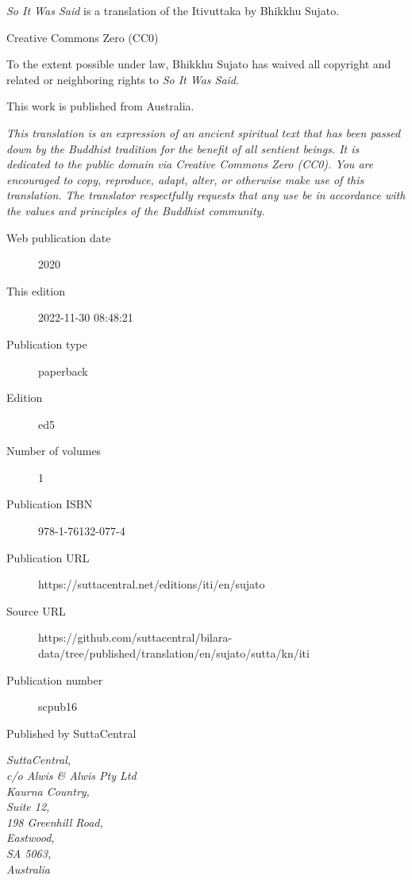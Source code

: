 \documentclass[12pt,openany]{book}%
\begin{document}
\begin{footnotesize}

\textit{So It Was Said} is a translation of the Itivuttaka by Bhikkhu Sujato.

\medskip

Creative Commons Zero (CC0)

To the extent possible under law, Bhikkhu Sujato has waived all copyright and related or neighboring rights to \textit{So It Was Said}.

\medskip

This work is published from Australia.

\begin{center}
\textit{This translation is an expression of an ancient spiritual text that has been passed down by the Buddhist tradition for the benefit of all sentient beings. It is dedicated to the public domain via Creative Commons Zero (CC0). You are encouraged to copy, reproduce, adapt, alter, or otherwise make use of this translation. The translator respectfully requests that any use be in accordance with the values and principles of the Buddhist community.}
\end{center}

\medskip

\begin{description}
    \item[Web publication date] 2020
    \item[This edition] 2022-11-30 08:48:21
    \item[Publication type] paperback
    \item[Edition] ed5
    \item[Number of volumes] 1
    \item[Publication ISBN] 978-1-76132-077-4
    \item[Publication URL] https://suttacentral.net/editions/iti/en/sujato
    \item[Source URL] https://github.com/suttacentral/bilara-data/tree/published/translation/en/sujato/sutta/kn/iti
    \item[Publication number] scpub16
\end{description}

\medskip

Published by SuttaCentral

\medskip

\textit{SuttaCentral,\\
c/o Alwis \& Alwis Pty Ltd\\
Kaurna Country,\\
Suite 12,\\
198 Greenhill Road,\\
Eastwood,\\
SA 5063,\\
Australia}

\end{footnotesize}
\end{document}
